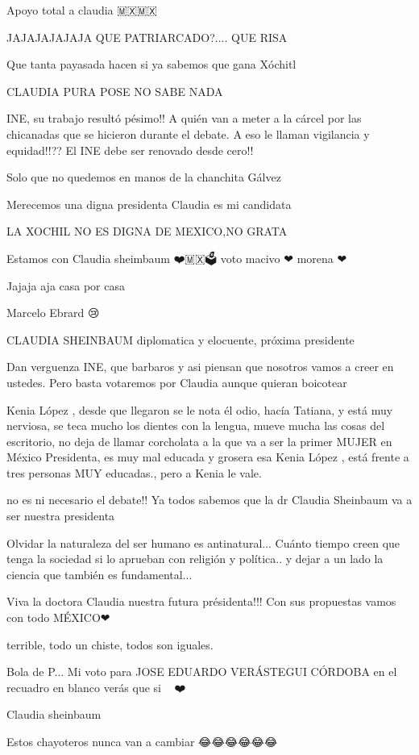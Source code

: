 Apoyo total a claudia 🇲🇽🇲🇽

JAJAJAJAJAJA QUE PATRIARCADO?....  QUE RISA

Que tanta payasada hacen si ya sabemos que gana Xóchitl 🥸

CLAUDIA PURA POSE NO SABE NADA

INE, su trabajo resultó pésimo!! A quién van a meter a la cárcel por las chicanadas  que se hicieron durante el debate. A eso le llaman vigilancia y equidad!!?? El INE debe ser renovado desde cero!!

Solo que no quedemos en manos de la chanchita Gálvez

Merecemos una digna presidenta Claudia es mi candidata

LA XOCHIL NO ES DIGNA DE MEXICO,NO GRATA

Estamos con Claudia sheimbaum ❤️🇲🇽🗳️ voto macivo ❤ morena ❤

Jajaja aja casa por casa

Marcelo  Ebrard 😢

CLAUDIA SHEINBAUM diplomatica y elocuente, próxima presidente

Dan verguenza INE, que barbaros y asi piensan que nosotros vamos a creer en ustedes. Pero basta votaremos por Claudia aunque quieran boicotear

Kenia López , desde que llegaron se le nota él odio, hacía Tatiana, y está muy nerviosa, se teca mucho los dientes con la lengua, mueve mucha las cosas del escritorio, no deja de llamar corcholata a la que va a ser la primer MUJER en México Presidenta, es muy mal educada y grosera esa Kenia  López , está frente a tres personas MUY educadas., pero a Kenia le vale.🥺

no es ni necesario el debate!! Ya todos sabemos que la dr Claudia Sheinbaum va a ser nuestra presidenta

Olvidar la naturaleza del ser humano es antinatural... Cuánto tiempo creen que tenga la sociedad si lo aprueban con religión y política.. y dejar a un lado la ciencia que también es fundamental...

Viva la doctora Claudia nuestra futura présidenta!!! Con sus propuestas vamos con todo MÉXICO❤🎉

terrible, todo un chiste, todos son iguales.

Bola de P... Mi voto para JOSE EDUARDO VERÁSTEGUI CÓRDOBA en el recuadro en blanco verás que si 🤌✅💯❤️🫶

Claudia sheinbaum

Estos chayoteros  nunca van a cambiar 😂😂😂😂😂😂


